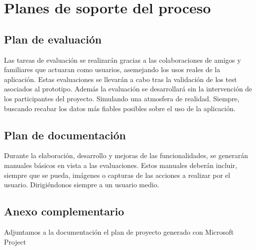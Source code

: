 \chapter{Planes de soporte del proceso}
\section{Plan de evaluación}
Las tareas de evaluación se realizarán gracias a las colaboraciones de amigos y familiares que actuaran como usuarios, asemejando los usos reales de la aplicación. Estas evaluaciones se llevarán a cabo tras la validación de los test asociados al prototipo. Además la evaluación se desarrollará sin la intervención de los participantes del proyecto. Simulando una atmosfera de realidad. Siempre, buscando recabar los datos más fiables posibles sobre el uso de la aplicación.
\section{Plan de documentación}
Durante la elaboración, desarrollo y mejoras de las funcionalidades, se generarán manuales básicos en vista a las evaluaciones. Estos manuales deberán incluir, siempre que se pueda, imágenes o capturas de las acciones a realizar por el usuario. Dirigiéndonos siempre a un usuario medio.

\section*{Anexo complementario}
Adjuntamos a la documentación el plan de proyecto generado con Microsoft Project
